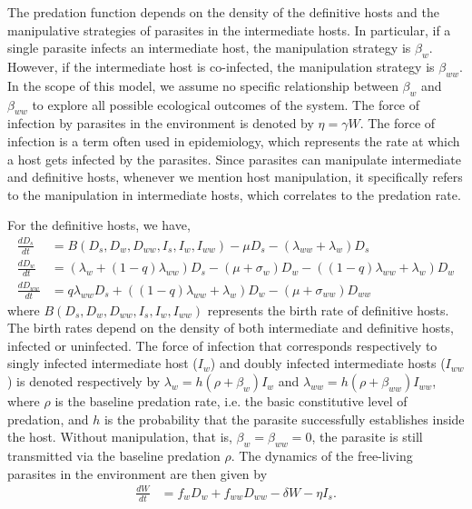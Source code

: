 \documentclass[a4paper]{scrartcl}
\begin{document}
The predation function depends on the density of the definitive hosts and the manipulative strategies of parasites in the intermediate hosts. 
In particular, if a single parasite infects an intermediate host, the manipulation strategy is $\beta_w$. 
However, if the intermediate host is co-infected, the manipulation strategy is $\beta_{ww}$. 
In the scope of this model, we assume no specific relationship between $\beta_w$ and $\beta_{ww}$ to explore all possible ecological outcomes of the system. 
The force of infection by parasites in the environment is denoted by $\eta = \gamma W$. 
The force of infection is a term often used in epidemiology, which represents the rate at which a host gets infected by the parasites.
Since parasites can manipulate intermediate and definitive hosts, whenever we mention host manipulation, it specifically refers to the manipulation in intermediate hosts, which correlates to the predation rate.

For the definitive hosts, we have,
%
\begin{align}
\frac{dD_s}{dt} &= B(D_s,  D_w,  D_{ww},  I_s, I_w, I_{ww})  - \mu D_s - (\lambda_{ww} + \lambda_w) D_s \nonumber \\    
\frac{dD_w}{dt} &= (\lambda_w + (1 - q) \lambda_{ww}) D_s - (\mu + \sigma_w) D_w - ((1 - q) \lambda_{ww} + \lambda_w) D_w  \label{odes:dhosts} \\         
\frac{dD_{ww}}{dt} &= q \lambda_{ww} D_s + ((1 - q) \lambda_{ww} + \lambda_w) D_w - (\mu + \sigma_{ww}) D_{ww} \nonumber
\end{align}
%
where $B(D_s, D_w, D_{ww}, I_s, I_w, I_{ww})$ represents the birth rate of definitive hosts.
The birth rates depend on the density of both intermediate and definitive hosts, infected or uninfected. 
The force of infection that corresponds respectively to singly infected intermediate host ($I_w$) and doubly infected intermediate hosts ($I_{ww}$) is denoted respectively by $\lambda_w = h (\rho + \beta_w)  I_w$ and $\lambda_{ww} = h (\rho + \beta_{ww}) I_{ww}$, where $\rho$ is the baseline predation rate, i.e. the basic constitutive level of predation, and $h$ is the probability that the parasite successfully establishes inside the host.
Without manipulation, that is, $\beta_w = \beta_{ww} = 0$, the parasite is still transmitted via the baseline predation $\rho$. 
The dynamics of the free-living parasites in the environment are then given by
\begin{align}
	\frac{dW}{dt} &= f_w D_w + f_{ww} D_{ww} - \delta W - \eta I_s. \label{odes:eparasite}
\end{align}
%
\end{document}
